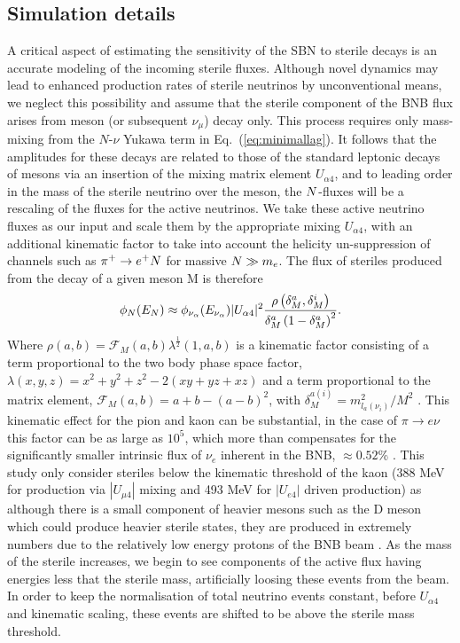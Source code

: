 \documentclass[11pt, a4paper]{article}
\newcommand{\refeq}[1]{Eq.~(\ref{#1})}
\def\ster{\ensuremath N}
\begin{document}
\subsection{Simulation details}
A critical aspect of estimating the sensitivity of the SBN to sterile decays is an
accurate modeling of the incoming sterile fluxes.  
%
Although novel dynamics may lead to enhanced production rates of sterile
neutrinos by unconventional means, we neglect this possibility and assume that
the sterile component of the BNB flux arises from meson (or subsequent $\nu_\mu$) decay only. This process
requires only mass-mixing from the $N$-$\nu$ Yukawa term in
\refeq{eq:minimallag}. It follows that the amplitudes for these decays are
related to those of the standard leptonic decays of mesons via an insertion of
the mixing matrix element $U_{\alpha 4}$, and to leading order in the mass of
the sterile neutrino over the meson, the $\ster$-fluxes will be a rescaling of
the fluxes for the active neutrinos. We take these active neutrino fluxes as our
input and scale them by the appropriate mixing $U_{\alpha 4}$, with an
additional kinematic factor to take into account the helicity un-suppression of
channels such as $\pi^+ \rightarrow e^+\ster$ for massive $\ster \gg m_e$. The
flux of steriles produced from the decay of a given meson M is therefore
%
\[ \phi_{\ster}(E_{\ster}) \approx \phi_{\nu_\alpha} (E_{\nu_\alpha})\vert
U_{\alpha 4}\vert^2 \frac{\rho\left( \delta_M^a , \delta_M^i
\right)}{\delta_M^a \left(1- \delta_M^a\right)^2}.  \]
%
Where $\rho(a,b)=\mathcal{F}_M(a,b) \lambda^{\frac{1}{2}}(1,a,b)$ is a
kinematic factor consisting of a term proportional to the two body phase space
factor, $\lambda(x,y,z)=x^2+y^2+z^2-2(x y+yz+x z)$ and a term proportional to
the matrix element, $\mathcal{F}_M(a,b)= a+b -\left(a-b\right)^2$, with
$\delta_M^{a(i)}=m_{l_a(\nu_i)}^2/M^2$ \cite{PhysRevD.24.1232}. This kinematic
effect for the pion and kaon can be substantial, in the case of $\pi
\rightarrow e \nu$ this factor can be as large as $10^5$, which more than compensates
for the significantly smaller intrinsic flux of $\nu_e$  inherent in the BNB, $\approx 0.52$\% \cite{AguilarArevalo:2008yp}. This study only
consider steriles below the kinematic threshold of the kaon (388 MeV for
production via $|U_{\mu4}|$ mixing and 493 MeV for $|U_{e4}|$ driven
production) as although there is a small component of heavier mesons such as
the D meson which could produce heavier sterile states, they are produced in
extremely numbers due to the relatively low energy protons of the BNB beam \cite{AguilarArevalo:2008yp}. As
the mass of the sterile increases, we begin to see components of the active flux
having energies less that the sterile mass, artificially loosing these events
from the beam. In order to keep the normalisation of total neutrino events
constant, before $U_{\alpha 4}$ and kinematic scaling, these events are shifted
to be above the sterile mass threshold.
\end{document}
